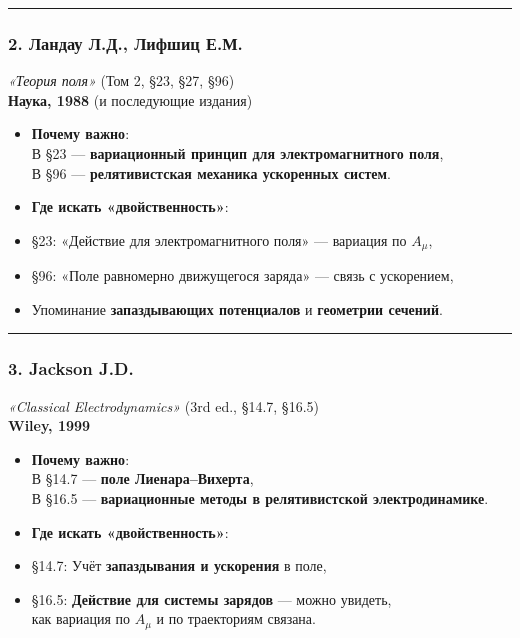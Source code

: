 \documentclass[11pt]{article}
\begin{document}
\begin{center}\rule{0.5\linewidth}{\linethickness}\end{center}

\subsubsection{\texorpdfstring{2. \textbf{Ландау Л.Д., Лифшиц
Е.М.}}{2. Ландау Л.Д., Лифшиц Е.М.}}\label{ux43bux430ux43dux434ux430ux443-ux43b.ux434.-ux43bux438ux444ux448ux438ux446-ux435.ux43c.}

\emph{«Теория поля»} (Том 2, §23, §27, §96)\\
\textbf{Наука, 1988} (и последующие издания)

\begin{itemize}
\item
  \textbf{Почему важно}:\\
  В §23 --- \textbf{вариационный принцип для электромагнитного поля},\\
  В §96 --- \textbf{релятивистская механика ускоренных систем}.
\item
  \textbf{Где искать «двойственность»}:\\
\item
  §23: «Действие для электромагнитного поля» --- вариация по
  \(A_\mu\),\\
\item
  §96: «Поле равномерно движущегося заряда» --- связь с ускорением,\\
\item
  Упоминание \textbf{запаздывающих потенциалов} и \textbf{геометрии
  сечений}.
\end{itemize}

\begin{center}\rule{0.5\linewidth}{\linethickness}\end{center}

\subsubsection{\texorpdfstring{3. \textbf{Jackson
J.D.}}{3. Jackson J.D.}}\label{jackson-j.d.}

\emph{«Classical Electrodynamics»} (3rd ed., §14.7, §16.5)\\
\textbf{Wiley, 1999}

\begin{itemize}
\item
  \textbf{Почему важно}:\\
  В §14.7 --- \textbf{поле Лиенара--Вихерта},\\
  В §16.5 --- \textbf{вариационные методы в релятивистской
  электродинамике}.
\item
  \textbf{Где искать «двойственность»}:\\
\item
  §14.7: Учёт \textbf{запаздывания и ускорения} в поле,\\
\item
  §16.5: \textbf{Действие для системы зарядов} --- можно увидеть,\\
  как вариация по \(A_\mu\) и по траекториям связана.
\end{itemize}
\end{document}
